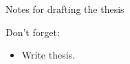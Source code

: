 \clearemptydoublepage

{}

\begin{center}
	\huge{Notes for drafting the thesis}
\end{center}


Don't forget:
\begin{itemize}
\item Write thesis.
\end{itemize}
